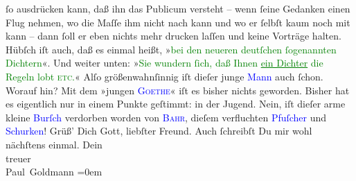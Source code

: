                ſo ausdrücken kann, daß ihn das Publicum versteht – wenn ſeine Gedanken einen Flug
               nehmen, {\pb}wo die Maſſe ihm nicht nach kann und wo er
               ſelbſt kaum noch mit kann – dann ſoll er eben \textcolor{gray}{} nichts mehr drucken laſſen und keine Vorträge halten. Hübſch iſt auch, daß
               es einmal heißt, »\textcolor{green}{bei den neueren deutſchen ſogenannten Dichtern}{}«. Und weiter unten:
               »\textcolor{green}{Sie wundern ſich, daß Ihnen \uline{ein Dichter} die Regeln
               lobt \textsc{etc.}}{}«
                Alſo größenwahnſinnig {\pb}iſt dieſer junge \textcolor{blue}{Mann}{} auch ſchon. Worauf hin? Mit dem »jungen \textsc{\textcolor{blue}{Goethe}{}\ledrightnote{\textcolor{blue}{Johann Wolfgang von Goethe}}}« iſt es bisher nichts geworden. Bisher hat es eigentlich nur in einem Punkte
               geſtimmt: in der Jugend.\pend
           \pstart
           Nein, iſt dieſer arme kleine \textcolor{blue}{Burſch}{} verdorben worden\strikeout{!} von \textsc{\textcolor{blue}{Bahr}{}\ledrightnote{\textcolor{blue}{Hermann Bahr}}}, dieſem verfluchten \textcolor{blue}{Pfuſcher}{} und \textcolor{blue}{Schurken}{}!\pend
           \pstart
           {\pb}Grüß’ Dich Gott, liebſter Freund.\pend
           \pstart
           Auch ſchreibſt Du mir wohl nächſtens einmal.\pend
           \pstart
           Dein {\\[\baselineskip]}treuer {\\[\baselineskip]}\spacefill\mbox{Paul Goldmann}\pend
           \leftskip=0em{}\endnumbering{}  
      